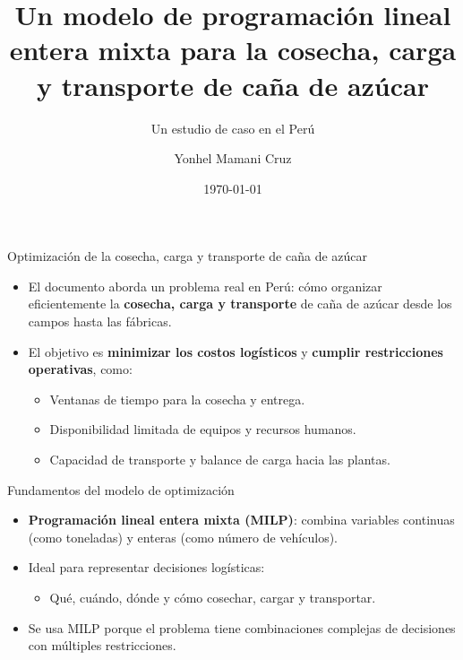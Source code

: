 \documentclass{beamer}
\title{Un modelo de programación lineal entera mixta para la cosecha, carga y transporte de caña de azúcar}
\subtitle{Un estudio de caso en el Perú}
\author{Yonhel Mamani Cruz}
\date{\today}
\begin{document}
\begin{frame}
  \titlepage
\end{frame}

\begin{frame}{ Optimización de la cosecha, carga y transporte de caña de azúcar}
  \begin{itemize}
    \item El documento aborda un problema real en Perú: cómo organizar eficientemente la \textbf{cosecha, carga y transporte} de caña de azúcar desde los campos hasta las fábricas.
    \vspace{0.3cm}
    \item El objetivo es \textbf{minimizar los costos logísticos} y \textbf{cumplir restricciones operativas}, como:
    \begin{itemize}
      \item Ventanas de tiempo para la cosecha y entrega.
      \item Disponibilidad limitada de equipos y recursos humanos.
      \item Capacidad de transporte y balance de carga hacia las plantas.
    \end{itemize}
  \end{itemize}
\end{frame}

\begin{frame}{Fundamentos del modelo de optimización}
  \begin{itemize}
    \item \textbf{Programación lineal entera mixta (MILP)}: combina variables continuas (como toneladas) y enteras (como número de vehículos).
    \item Ideal para representar decisiones logísticas:
    \begin{itemize}
      \item Qué, cuándo, dónde y cómo cosechar, cargar y transportar.
    \end{itemize}
    \item Se usa MILP porque el problema tiene combinaciones complejas de decisiones con múltiples restricciones.
  \end{itemize}
\end{frame}
\end{document}
